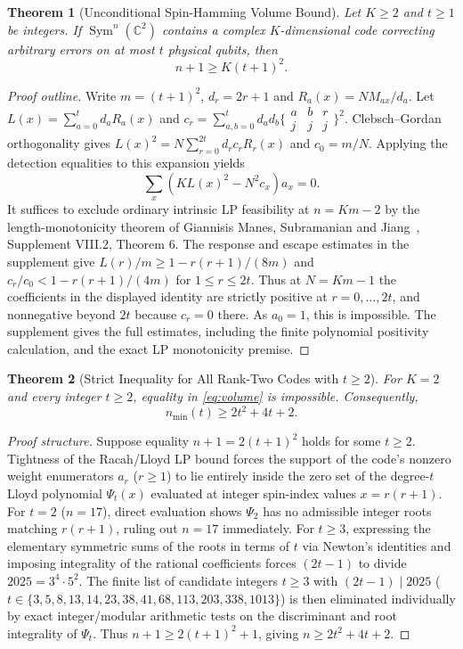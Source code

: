 \documentclass[11pt,letterpaper]{article}
\newtheorem{theorem}{Theorem}[section]
\theoremstyle{definition}
\theoremstyle{remark}
\newcommand{\Sym}{\operatorname{Sym}}
\newcommand{\C}{\mathbb{C}}
\begin{document}
\begin{theorem}[Unconditional Spin-Hamming Volume Bound]\label{thm:volume}
Let $K \ge 2$ and $t \ge 1$ be integers. If $\Sym^n(\C^2)$ contains a complex $K$-dimensional code correcting arbitrary errors on at most $t$ physical qubits, then
\begin{equation}\label{eq:volume}
  n + 1 \ge K(t+1)^2.
\end{equation}
\end{theorem}
\begin{proof}[Proof outline]
Write $m=(t+1)^2$, $d_r=2r+1$ and $R_a(x)=N M_{ax}/d_a$. Let $L(x)=\sum_{a=0}^t d_aR_a(x)$ and $c_r=\sum_{a,b=0}^t d_ad_b\bigl\{\begin{smallmatrix}a&b&r\\j&j&j\end{smallmatrix}\bigr\}^2$. Clebsch--Gordan orthogonality gives $L(x)^2=N\sum_{r=0}^{2t}d_rc_rR_r(x)$ and $c_0=m/N$. Applying the detection equalities to this expansion yields
\[
\sum_x (K L(x)^2-N^2c_x)a_x=0.
\]
It suffices to exclude ordinary intrinsic LP feasibility at $n=Km-2$ by the length-monotonicity theorem of Giannisis Manes, Subramanian and Jiang~\cite{TwoModeLoss2026}, Supplement VIII.2, Theorem 6. The response and escape estimates in the supplement give $L(r)/m\ge1-r(r+1)/(8m)$ and $c_r/c_0<1-r(r+1)/(4m)$ for $1\le r\le2t$. Thus at $N=Km-1$ the coefficients in the displayed identity are strictly positive at $r=0,\ldots,2t$, and nonnegative beyond $2t$ because $c_r=0$ there. As $a_0=1$, this is impossible. The supplement gives the full estimates, including the finite polynomial positivity calculation, and the exact LP monotonicity premise.
\end{proof}

\begin{theorem}[Strict Inequality for All Rank-Two Codes with $t \ge 2$]\label{thm:all-t-strict}
For $K=2$ and every integer $t \ge 2$, equality in \eqref{eq:volume} is impossible. Consequently,
\begin{equation}\label{eq:strict-lower}
  n_{\min}(t) \ge 2t^2 + 4t + 2.
\end{equation}
\end{theorem}
\begin{proof}[Proof structure]
Suppose equality $n+1 = 2(t+1)^2$ holds for some $t \ge 2$. Tightness of the Racah/Lloyd LP bound forces the support of the code's nonzero weight enumerators $a_r$ ($r \ge 1$) to lie entirely inside the zero set of the degree-$t$ Lloyd polynomial $\Psi_t(x)$ evaluated at integer spin-index values $x = r(r+1)$. For $t=2$ ($n=17$), direct evaluation shows $\Psi_2$ has no admissible integer roots matching $r(r+1)$, ruling out $n=17$ immediately. For $t \ge 3$, expressing the elementary symmetric sums of the roots in terms of $t$ via Newton's identities and imposing integrality of the rational coefficients forces $(2t-1)$ to divide $2025 = 3^4 \cdot 5^2$. The finite list of candidate integers $t \ge 3$ with $(2t-1) \mid 2025$ ($t \in \{3,5,8,13,14,23,38,41,68,113,203,338,1013\}$) is then eliminated individually by exact integer/modular arithmetic tests on the discriminant and root integrality of $\Psi_t$. Thus $n+1 \ge 2(t+1)^2 + 1$, giving $n \ge 2t^2+4t+2$.
\end{proof}
\end{document}
